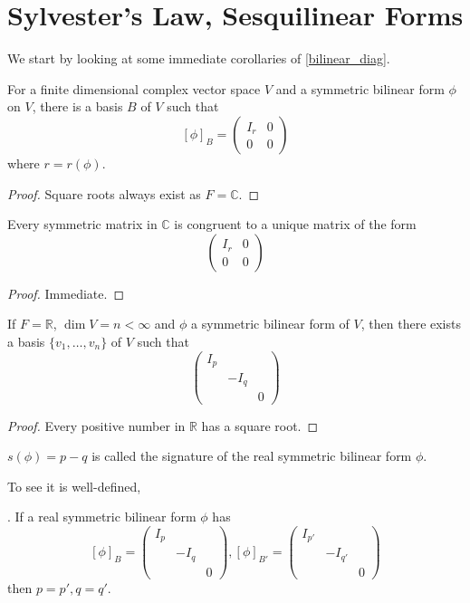 \section{Sylvester's Law, Sesquilinear Forms}
We start by looking at some immediate corollaries of \ref{bilinear_diag}.
\begin{corollary}
    For a finite dimensional complex vector space $V$ and a symmetric bilinear form $\phi$ on $V$, there is a basis $B$ of $V$ such that
    $$[\phi]_B=\begin{pmatrix}
        I_r&0\\
        0&0
    \end{pmatrix}$$
    where $r=r(\phi)$.
\end{corollary}
\begin{proof}
    Square roots always exist as $F=\mathbb C$.
\end{proof}
\begin{corollary}
    Every symmetric matrix in $\mathbb C$ is congruent to a unique matrix of the form
    $$\begin{pmatrix}
        I_r&0\\
        0&0
    \end{pmatrix}$$
\end{corollary}
\begin{proof}
    Immediate.
\end{proof}
\begin{corollary}
    If $F=\mathbb R$, $\dim V=n<\infty$ and $\phi$ a symmetric bilinear form of $V$, then there exists a basis $\{v_1,\ldots,v_n\}$ of $V$ such that
    $$\begin{pmatrix}
        I_p&&\\
        &-I_q&\\
        &&0
    \end{pmatrix}$$
\end{corollary}
\begin{proof}
    Every positive number in $\mathbb R$ has a square root.
\end{proof}
\begin{definition}
    $s(\phi)=p-q$ is called the signature of the real symmetric bilinear form $\phi$.
\end{definition}
To see it is well-defined,
\begin{theorem}.
    If a real symmetric bilinear form $\phi$ has
    $$[\phi]_B=\begin{pmatrix}
        I_p&&\\
        &-I_q&\\
        &&0
    \end{pmatrix},[\phi]_{B'}=\begin{pmatrix}
        I_{p'}&&\\
        &-I_{q'}&\\
        &&0
    \end{pmatrix}$$
    then $p=p',q=q'$.
\end{theorem}
